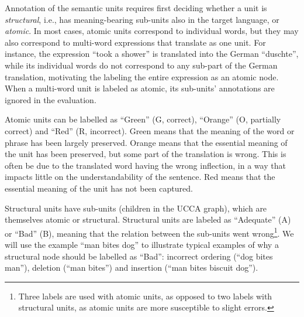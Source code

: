 \documentclass[11pt,letterpaper]{article}
\newcommand{\XXX}[1]{{\color{red}XXX #1}} %
\begin{document}
Annotation of the semantic units requires first deciding whether
a unit is {\it structural}, i.e., has meaning-bearing sub-units also in the
target language, or {\it atomic}.
In most cases, atomic units
correspond to individual words, but they may also correspond to
multi-word expressions that translate as one unit. For instance,
the expression ``took a shower'' is translated into the German ``duschte'',
while its individual words do not correspond to any sub-part of the German translation,
motivating the labeling the entire expression as an atomic node.
When a multi-word unit is labeled as atomic, its sub-units' annotations are ignored
in the evaluation.

Atomic units can be labelled as ``Green'' (G, correct), ``Orange'' (O, partially correct)
and ``Red'' (R, incorrect). 
Green means that the meaning of the word or phrase has been largely preserved.
Orange means that the essential meaning of the unit has been preserved,
but some part of the translation is wrong.
This is often be due to the translated word having the wrong inflection,
in a way that impacts little on the understandability of the sentence.
Red means that the essential meaning of the unit has not been captured.

Structural units have sub-units (children in the UCCA graph),
which are themselves atomic or structural.
Structural units are labeled as ``Adequate'' (A) or ``Bad'' (B), meaning
that the relation between the sub-units went wrong\footnote{
  Three labels are used with atomic units, as opposed to two labels with structural units,
as atomic units are more susceptible to slight errors.}.
We will use the example ``man bites dog'' to illustrate typical examples of why a structural node
should be labelled as ``Bad'':
incorrect ordering (``dog bites man''), 
deletion (``man bites'') and insertion (``man bites biscuit dog''). 
\end{document}
